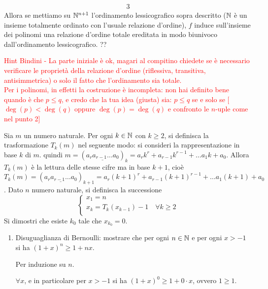 \documentclass[a4paper]{article}\par \usepackage{style}\par
\begin{document}
\begin{enumerate}
\begin{alignat*}{3}
  \end{alignat*}
  Allora se mettiamo su $ \mathbb{N}^{n + 1} $ l'ordinamento lessicografico sopra descritto ($ \mathbb{N} $ è un insieme totalmente ordinato con l'usuale relazione d'ordine), $ f $ induce sull'insieme dei polinomi una relazione d'ordine totale ereditata in modo biunivoco dall'ordinamento lessicografico. ?? \\
\end{enumerate}\par \textcolor{red}{Hint Bindini -  La parte iniziale è ok, magari al compitino chiedete se è necessario verificare le proprietà della relazione d'ordine (riflessiva, transitiva, antisimmetrica) o solo il fatto che l'ordinamento sia totale. \\
  Per i polinomi, in effetti la costruzione è incompleta: non hai definito bene quando è che $ p \leq q $, e credo che la tua idea (giusta) sia: $ p \leq q $ se e solo se [$ \deg(p) < \deg(q) $ oppure $ \deg(p) = \deg(q) $ e confronto le $ n $-uple come nel punto 2]}\par \begin{es}
  Sia $ m $ un numero naturale. Per ogni $ k \in \mathbb{N} $ con $ k \geq 2 $, si definisca la trasformazione $ T_k(m) $ nel seguente modo: si consideri la rappresentazione in base $ k $ di $ m $. quindi $ m = (\underline{a_r a_{r-1} \dots a_0})_k = a_r k^r + a_{r-1} k^{r-1} + \dots a_1 k + a_0 $. Allora $ T_k(m) $ è la lettura delle stesse cifre ma in base $ k + 1 $, cioè $ T_k(m) = (\underline{a_r a_{r-1} \dots a_0})_{k+1} = a_r (k + 1)^r + a_{r-1} (k + 1)^{r-1} + \dots a_1 (k + 1) + a_0 $. Dato $ n $ numero naturale, si definisca la successione
  \[\begin{cases*}
      x_1 = n \\
      x_k = T_k(x_{k-1}) - 1 \quad \forall k \geq 2 \\
    \end{cases*}\]
  Si dimostri che esiste $ k_0 $ tale che $ x_{k_0} = 0. $
\end{es}\par \begin{enumerate}
\item Disuguaglianza di Bernoulli: mostrare che per ogni $ n \in \mathbb{N} $ e per ogni $ x > -1 $ si ha $ (1 + x)^n \geq 1 + nx $. \\\par   Per induzione su $ n $.
  \begin{pbase}
    $ \forall x $, e in particolare per $ x > -1 $ si ha $ (1 + x)^0 \geq 1 + 0 \cdot x $, ovvero $ 1 \geq 1 $.

\end{pbase}
\end{enumerate}
\end{document}
